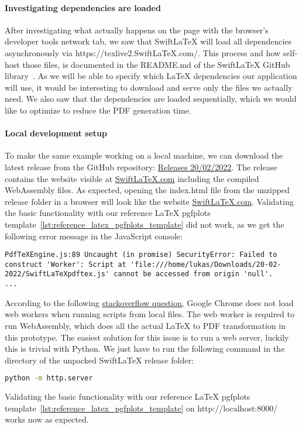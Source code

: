 \paragraph{Investigating dependencies are loaded}
After investigating what actually happens on the page with the browser's developer tools network tab, we saw that SwiftLaTeX will load all dependencies asynchronously via https://texlive2.SwiftLaTeX.com/.
This process and how self-host those files, is documented in the README.md of the SwiftLaTeX GitHub library~\cite{SwiftLaTeX_github_repository}.
As we will be able to specify which LaTeX dependencies our application will use, it would be interesting to download and serve only the files we actually need.
We also saw that the dependencies are loaded sequentially, which we would like to optimize to reduce the PDF generation time.

\paragraph{Local development setup}
To make the same example working on a local machine, we can download the latest release from the GitHub repository: \href{https://github.com/SwiftLaTeX/SwiftLaTeX/releases/tag/v20022022}{Releases 20/02/2022}.
The release contains the website visible at \href{https://www.SwiftLaTeX.com/}{SwiftLaTeX.com} including the compiled WebAssembly files.
As expected, opening the index.html file from the unzipped release folder in a browser will look like the website \href{https://www.SwiftLaTeX.com/}{SwiftLaTeX.com}.
Validating the basic functionality with our reference LaTeX pgfplots template~\autoref{lst:reference_latex_pgfplots_template} did not work, as we get the following error message in the JavaScript console:
\begin{lstlisting}[caption={SwiftLaTeX local development setup: JavaScript error message},label={lst:SwiftLaTeX_local_setup_js_error}]
PdfTeXEngine.js:89 Uncaught (in promise) SecurityError: Failed to construct 'Worker': Script at 'file:///home/lukas/Downloads/20-02-2022/SwiftLaTeXpdftex.js' cannot be accessed from origin 'null'.
...
\end{lstlisting}

According to the following \href{https://stackoverflow.com/questions/21408510/chrome-cant-load-web-worker}{stackoverflow question}, Google Chrome does not load web workers when running scripts from local files.
The web worker is required to run WebAssembly, which does all the actual LaTeX to PDF transformation in this prototype.
The easiest solution for this issue is to run a web server, luckily this is trivial with Python.
We just have to run the following command in the directory of the unpacked SwiftLaTeX release folder:
\begin{lstlisting}[caption={Start a webserver on http://localhost:8000/ with Python},language=bash,label={lst:lstlisting}]
python -m http.server
\end{lstlisting}
Validating the basic functionality with our reference LaTeX pgfplots template~\autoref{lst:reference_latex_pgfplots_template} on http://localhost:8000/ works now as expected.

